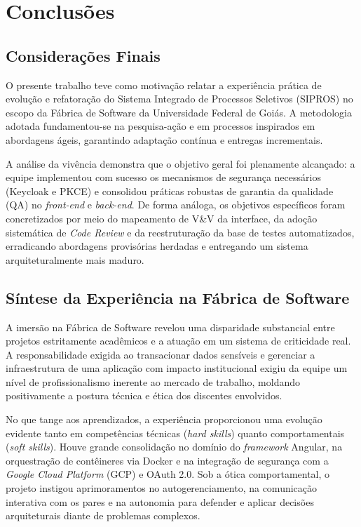 \chapter{Conclusões}
\label{cap:conclusoes}

\section{Considerações Finais}

O presente trabalho teve como motivação relatar a experiência prática de evolução e refatoração do Sistema Integrado de Processos Seletivos (SIPROS) no escopo da Fábrica de Software da Universidade Federal de Goiás. A metodologia adotada fundamentou-se na pesquisa-ação e em processos inspirados em abordagens ágeis, garantindo adaptação contínua e entregas incrementais.

A análise da vivência demonstra que o objetivo geral foi plenamente alcançado: a equipe implementou com sucesso os mecanismos de segurança necessários (Keycloak e PKCE) e consolidou práticas robustas de garantia da qualidade (QA) no \textit{front-end} e \textit{back-end}. De forma análoga, os objetivos específicos foram concretizados por meio do mapeamento de V\&V da interface, da adoção sistemática de \textit{Code Review} e da reestruturação da base de testes automatizados, erradicando abordagens provisórias herdadas e entregando um sistema arquiteturalmente mais maduro.

\section{Síntese da Experiência na Fábrica de Software}

A imersão na Fábrica de Software revelou uma disparidade substancial entre projetos estritamente acadêmicos e a atuação em um sistema de criticidade real. A responsabilidade exigida ao transacionar dados sensíveis e gerenciar a infraestrutura de uma aplicação com impacto institucional exigiu da equipe um nível de profissionalismo inerente ao mercado de trabalho, moldando positivamente a postura técnica e ética dos discentes envolvidos.

No que tange aos aprendizados, a experiência proporcionou uma evolução evidente tanto em competências técnicas (\textit{hard skills}) quanto comportamentais (\textit{soft skills}). Houve grande consolidação no domínio do \textit{framework} Angular, na orquestração de contêineres via Docker e na integração de segurança com a \textit{Google Cloud Platform} (GCP) e OAuth 2.0. Sob a ótica comportamental, o projeto instigou aprimoramentos no autogerenciamento, na comunicação interativa com os pares e na autonomia para defender e aplicar decisões arquiteturais diante de problemas complexos.

